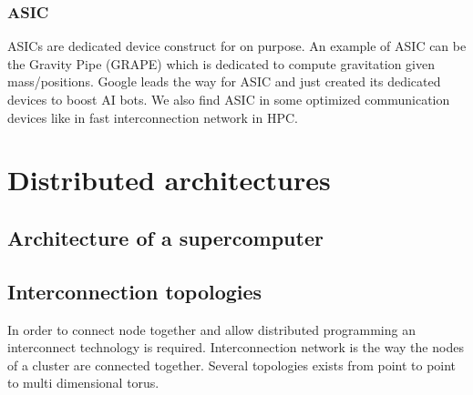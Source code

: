 \subsubsection{ASIC}
ASICs are dedicated device construct for on purpose. 
An example of ASIC can be the Gravity Pipe (GRAPE) which is dedicated to compute gravitation given mass/positions.
Google leads the way for ASIC and just created its dedicated devices to boost AI bots.
We also find ASIC in some optimized communication devices like in fast interconnection network in HPC.  

\section{Distributed architectures}

\subsection{Architecture of a supercomputer}

\subsection{Interconnection topologies}
In order to connect node together and allow distributed programming an interconnect technology is required. 
Interconnection network is the way the nodes of a cluster are connected together. 
Several topologies exists from point to point to multi dimensional torus.

